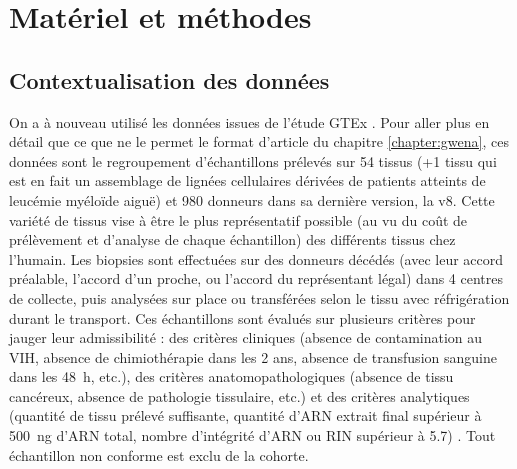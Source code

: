 
\section{Matériel et méthodes}

\subsection{Contextualisation des données}

On a à nouveau utilisé les données issues de l'étude GTEx . Pour aller plus en détail que ce que ne le permet le format d'article du chapitre \ref{chapter:gwena}, ces données sont le regroupement d'échantillons prélevés sur 54 tissus (+1 tissu qui est en fait un assemblage de lignées cellulaires dérivées de patients atteints de leucémie myéloïde aiguë) et 980 donneurs dans sa dernière version, la v8. Cette variété de tissus vise à être le plus représentatif possible (au vu du coût de prélèvement et d'analyse de chaque échantillon) des différents tissus chez l'humain. Les biopsies sont effectuées sur des donneurs décédés (avec leur accord préalable, l'accord d'un proche, ou l'accord du représentant légal) dans 4 centres de collecte, puis analysées sur place ou transférées selon le tissu avec réfrigération durant le transport. Ces échantillons sont évalués sur plusieurs critères pour jauger leur admissibilité : des critères cliniques (absence de contamination au VIH, absence de chimiothérapie dans les 2 ans, absence de transfusion sanguine dans les 48 h, etc.), des critères anatomopathologiques (absence de tissu cancéreux, absence de pathologie tissulaire, etc.) et des critères analytiques (quantité de tissu prélevé suffisante, quantité d'ARN extrait final supérieur à 500 ng d'ARN total, nombre d'intégrité d'ARN ou RIN supérieur à 5.7) . Tout échantillon non conforme est exclu de la cohorte.

